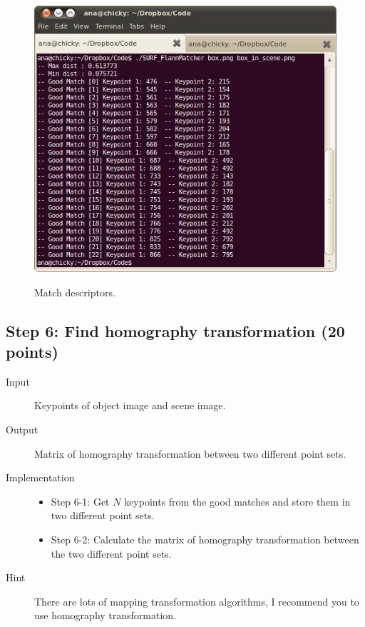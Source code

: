 \documentclass[12pt]{article}
\begin{document}
\begin{description}
\begin{figure}[!ht]
{    \includegraphics[height=0.3\textheight]{Feature_FlannMatcher_Keypoints_Result.jpg}} 
  \caption{Match descriptors.}
  \label{fig: Match descriptors} %
\end{figure}
\end{description}

\subsection{Step 6: Find homography transformation (20 points)}

\begin{description}
\item[Input] Keypoints of object image and scene image.
\item[Output] Matrix of homography transformation between two different point sets.
\item[Implementation] \mbox{}
\begin{itemize}
\item Step 6-1: Get $N$ keypoints from the good matches and store them in two different point sets.
\item Step 6-2: Calculate the matrix of homography transformation between the two different point sets.
\end{itemize} 
\item[Hint] There are lots of mapping transformation algorithms, I recommend you to use homography transformation.
\end{description}
\end{document}
